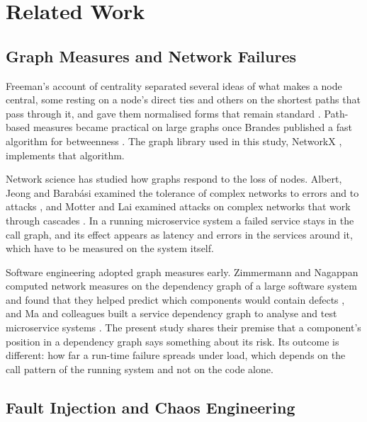 \section{Related Work}
\label{sec:related}

\subsection{Graph Measures and Network Failures}

Freeman's account of centrality separated several ideas of what makes a node central, some
resting on a node's direct ties and others on the shortest paths that pass through it, and
gave them normalised forms that remain standard \cite{freeman1978}. Path-based measures became
practical on large graphs once Brandes published a fast algorithm for betweenness
\cite{brandes2001}. The graph library used in this study, NetworkX 
\cite{hagberg2008}, implements that algorithm.

Network science has studied how graphs respond to the loss of nodes. Albert, Jeong and
Barab\'asi examined the tolerance of complex networks to errors and to attacks
\cite{albert2000}, and Motter and Lai examined attacks on complex networks that work through
cascades \cite{motter2002}. In a running microservice system a failed service stays in the call
graph, and its effect appears as latency and errors in the services around it, which have to be
measured on the system itself.

Software engineering adopted graph measures early. Zimmermann and Nagappan computed network
measures on the dependency graph of a large software system and found that they helped predict
which components would contain defects \cite{zimmermann2008}, and Ma and colleagues built a
service dependency graph to analyse and test microservice systems \cite{ma2018}. The present
study shares their premise that a component's position in a dependency graph says something
about its risk. Its outcome is different: how far a run-time failure spreads under load, which
depends on the call pattern of the running system and not on the code alone.

\subsection{Fault Injection and Chaos Engineering}

